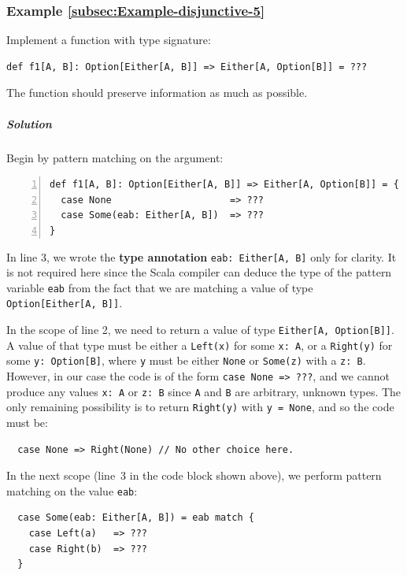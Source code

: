 \subsubsection{Example \label{subsec:Example-disjunctive-5}\ref{subsec:Example-disjunctive-5}}

Implement a function with type signature:
\begin{lstlisting}
def f1[A, B]: Option[Either[A, B]] => Either[A, Option[B]] = ???
\end{lstlisting}
The function should preserve information as much as possible.

\subparagraph{Solution}

Begin by pattern matching on the argument:
\begin{lstlisting}[numbers=left]
def f1[A, B]: Option[Either[A, B]] => Either[A, Option[B]] = {
  case None                     => ???
  case Some(eab: Either[A, B])  => ???
}
\end{lstlisting}
In line 3, we wrote the \textbf{type annotation}
\lstinline!eab: Either[A, B]! only for clarity. It is not required
here since the Scala compiler can deduce the type of the pattern variable
\lstinline!eab! from the fact that we are matching a value of type
\lstinline!Option[Either[A, B]]!.

In the scope of line 2, we need to return a value of type \lstinline!Either[A, Option[B]]!.
A value of that type must be either a \lstinline!Left(x)! for some
\lstinline!x: A!, or a \lstinline!Right(y)! for some \lstinline!y: Option[B]!,
where \lstinline!y! must be either \lstinline!None! or \lstinline!Some(z)!
with a \lstinline!z: B!. However, in our case the code is of the
form \lstinline!case None => ???!, and we cannot produce any values
\lstinline!x: A! or \lstinline!z: B! since \lstinline!A! and \lstinline!B!
are arbitrary, unknown types. The only remaining possibility is to
return \lstinline!Right(y)! with \lstinline!y = None!, and so the
code must be:
\begin{lstlisting}
  case None => Right(None) // No other choice here.
\end{lstlisting}

In the next scope (line~3 in the code block shown above), we perform
pattern matching on the value \lstinline!eab!:
\begin{lstlisting}
  case Some(eab: Either[A, B]) = eab match {
    case Left(a)   => ???
    case Right(b)  => ???
  }
\end{lstlisting}

